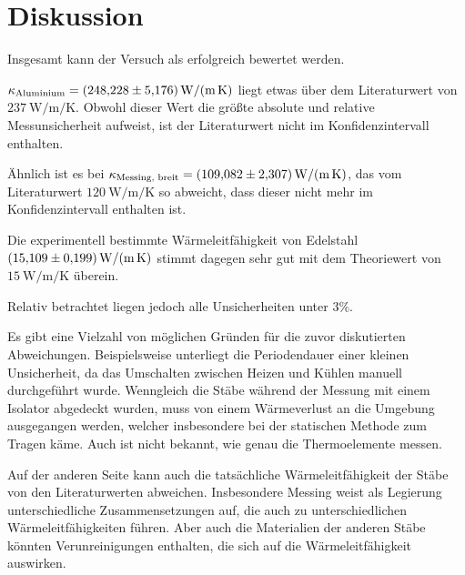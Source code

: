 \section{Diskussion} \label{sec:diskussion}

Insgesamt kann der Versuch als erfolgreich bewertet werden.

$\kappa_\text{Aluminium} = \SI{248.228 \pm 5.176}{\watt\per\meter\per\kelvin}$ liegt etwas über dem Literaturwert von $\SI{237}{\watt\per\meter\per\kelvin}$.
Obwohl dieser Wert die größte absolute und relative Messunsicherheit aufweist,
ist der Literaturwert nicht im Konfidenzintervall enthalten.

Ähnlich ist es bei $\kappa_\text{Messing, breit} = \SI{109.082 \pm 2.307}{\watt\per\meter\per\kelvin}$,
das vom Literaturwert $\SI{120}{\watt\per\meter\per\kelvin}$ so abweicht,
dass dieser nicht mehr im Konfidenzintervall enthalten ist.

Die experimentell bestimmte Wärmeleitfähigkeit von Edelstahl $\SI{15.109 \pm 0.199}{\watt\per\meter\per\kelvin}$
stimmt dagegen sehr gut mit dem Theoriewert von $\SI{15}{\watt\per\meter\per\kelvin}$ überein.

Relativ betrachtet liegen jedoch alle Unsicherheiten unter $3 \%$.


Es gibt eine Vielzahl von möglichen Gründen für die zuvor diskutierten Abweichungen.
Beispielsweise unterliegt die Periodendauer einer kleinen Unsicherheit,
da das Umschalten zwischen Heizen und Kühlen manuell durchgeführt wurde.
Wenngleich die Stäbe während der Messung mit einem Isolator abgedeckt wurden,
muss von einem Wärmeverlust an die Umgebung ausgegangen werden,
welcher insbesondere bei der statischen Methode zum Tragen käme.
Auch ist nicht bekannt, wie genau die Thermoelemente messen.

Auf der anderen Seite kann auch die tatsächliche Wärmeleitfähigkeit der Stäbe von den Literaturwerten abweichen.
Insbesondere Messing weist als Legierung unterschiedliche Zusammensetzungen auf,
die auch zu unterschiedlichen Wärmeleitfähigkeiten führen.
Aber auch die Materialien der anderen Stäbe könnten Verunreinigungen enthalten,
die sich auf die Wärmeleitfähigkeit auswirken.
